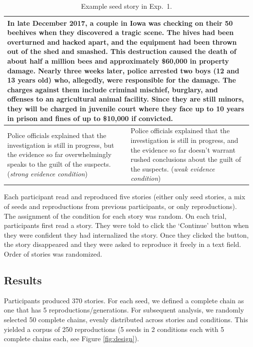 \documentclass[10pt,letterpaper]{article}
\begin{document}
\begin{table}
\caption{Example seed story in Exp.~1.}
\centering
\begin{tabular}{p{} p{}}
\toprule
\multicolumn{2}{p{\textwidth}}{In late December 2017, a couple in Iowa was checking on their 50 beehives when they discovered a tragic scene. The hives had been overturned and hacked apart, and the equipment had been thrown out of the shed and smashed. This destruction caused the death of about half a million bees and approximately \$60,000 in property damage. Nearly three weeks later, police arrested two boys (12 and 13 years old) who, allegedly, were responsible for the damage. The charges against them include criminal mischief, burglary, and offenses to an agricultural animal facility. Since they are still minors, they will be charged in juvenile court where they face up to 10 years in prison and fines of up to \$10,000 if convicted.}\\
\midrule
Police officials explained that the investigation is still in progress, but the evidence so far overwhelmingly speaks to the guilt of the suspects. (\emph{strong evidence condition}) & Police officials explained that the investigation is still in progress, and the evidence so far doesn't warrant rushed conclusions about the guilt of the suspects. (\emph{weak evidence condition})  \\
\bottomrule
\end{tabular}
\label{tab:examplestory}
\end{table}

Each participant read and reproduced five stories (either only seed stories, a mix of seeds and reproductions from previous participants, or only reproductions). The assignment of the condition for each story was random. On each trial, participants first read a story. They were told to click the `Continue' button when they were confident they had internalized the story. Once they clicked the button, the story disappeared and they were asked to reproduce it freely in a text field. Order of stories was randomized.

\subsection{Results}

Participants produced 370 stories. For each seed, we defined a complete chain as one that has 5 reproductions/generations. For subsequent analysis, we randomly selected 50 complete chains, evenly distributed across stories and conditions. This yielded a corpus of 250 reproductions (5 seeds in 2 conditions each with 5 complete chains each, see Figure \ref{fig:design}).
\end{document}
